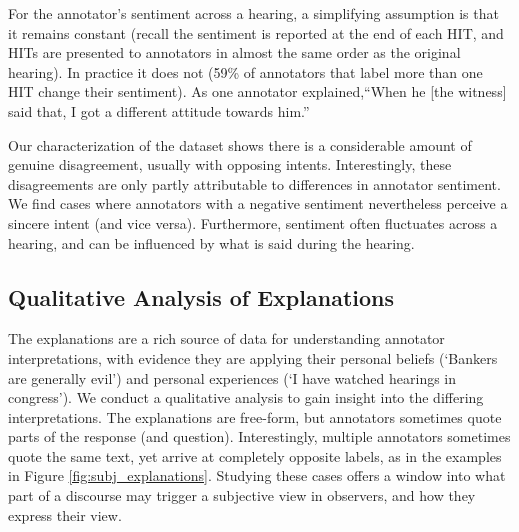 
For the annotator's sentiment across a hearing, a simplifying assumption is that it remains constant (recall the sentiment is reported at the end of each HIT, and HITs are presented to annotators in almost the same order as the original hearing). In practice it does not (59\% of annotators that label more than one HIT change their sentiment). 
As one annotator explained,``When he [the witness] said that, I got a different attitude towards him.'' 

Our characterization of the dataset shows there is a considerable amount of genuine disagreement, usually with opposing intents. Interestingly, these disagreements are only partly attributable to differences in annotator sentiment. We find cases where annotators with a negative sentiment nevertheless perceive a sincere intent (and vice versa). Furthermore, sentiment often fluctuates across a hearing, and can be influenced by what is said during the hearing.

\subsection{Qualitative Analysis of Explanations}
The explanations are a rich source of data for understanding annotator interpretations, with evidence they are applying their personal beliefs (`Bankers are generally evil') and personal experiences (`I have watched hearings in congress'). We conduct a qualitative analysis to gain insight into the differing interpretations.  The explanations are free-form, but annotators sometimes quote parts of the response (and question). Interestingly, multiple annotators sometimes quote the same text, yet arrive at completely opposite labels, as in the examples in Figure \ref{fig:subj_explanations}. Studying these cases offers a window into what part of a discourse may trigger a subjective view in observers, and how they express their view. 

